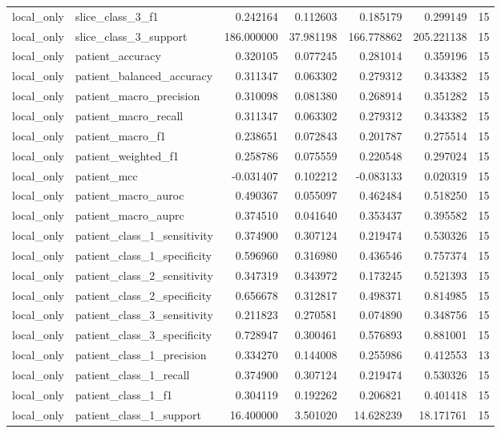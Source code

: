 \begin{tabular}{llrrrrr}
local_only & slice_class_3_f1 & 0.242164 & 0.112603 & 0.185179 & 0.299149 & 15 \\
local_only & slice_class_3_support & 186.000000 & 37.981198 & 166.778862 & 205.221138 & 15 \\
local_only & patient_accuracy & 0.320105 & 0.077245 & 0.281014 & 0.359196 & 15 \\
local_only & patient_balanced_accuracy & 0.311347 & 0.063302 & 0.279312 & 0.343382 & 15 \\
local_only & patient_macro_precision & 0.310098 & 0.081380 & 0.268914 & 0.351282 & 15 \\
local_only & patient_macro_recall & 0.311347 & 0.063302 & 0.279312 & 0.343382 & 15 \\
local_only & patient_macro_f1 & 0.238651 & 0.072843 & 0.201787 & 0.275514 & 15 \\
local_only & patient_weighted_f1 & 0.258786 & 0.075559 & 0.220548 & 0.297024 & 15 \\
local_only & patient_mcc & -0.031407 & 0.102212 & -0.083133 & 0.020319 & 15 \\
local_only & patient_macro_auroc & 0.490367 & 0.055097 & 0.462484 & 0.518250 & 15 \\
local_only & patient_macro_auprc & 0.374510 & 0.041640 & 0.353437 & 0.395582 & 15 \\
local_only & patient_class_1_sensitivity & 0.374900 & 0.307124 & 0.219474 & 0.530326 & 15 \\
local_only & patient_class_1_specificity & 0.596960 & 0.316980 & 0.436546 & 0.757374 & 15 \\
local_only & patient_class_2_sensitivity & 0.347319 & 0.343972 & 0.173245 & 0.521393 & 15 \\
local_only & patient_class_2_specificity & 0.656678 & 0.312817 & 0.498371 & 0.814985 & 15 \\
local_only & patient_class_3_sensitivity & 0.211823 & 0.270581 & 0.074890 & 0.348756 & 15 \\
local_only & patient_class_3_specificity & 0.728947 & 0.300461 & 0.576893 & 0.881001 & 15 \\
local_only & patient_class_1_precision & 0.334270 & 0.144008 & 0.255986 & 0.412553 & 13 \\
local_only & patient_class_1_recall & 0.374900 & 0.307124 & 0.219474 & 0.530326 & 15 \\
local_only & patient_class_1_f1 & 0.304119 & 0.192262 & 0.206821 & 0.401418 & 15 \\
local_only & patient_class_1_support & 16.400000 & 3.501020 & 14.628239 & 18.171761 & 15 \\

\end{tabular}
